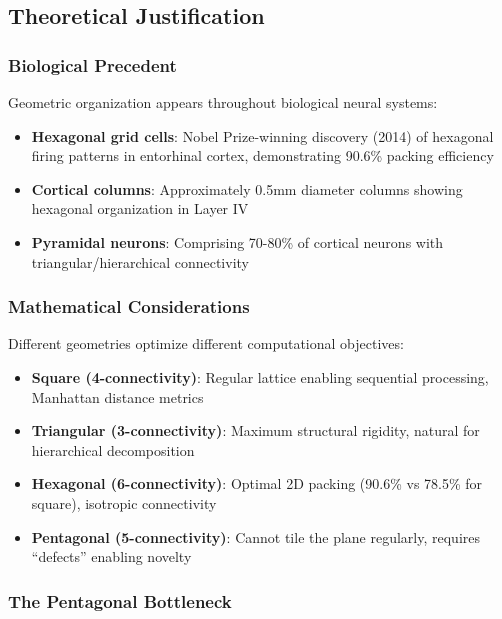 \documentclass[pmlr,onecolumn]{jmlr}
\begin{document}
\subsection{Theoretical Justification}

\subsubsection{Biological Precedent}

Geometric organization appears throughout biological neural systems:

\begin{itemize}
\item \textbf{Hexagonal grid cells}: Nobel Prize-winning discovery (2014) of hexagonal firing patterns in entorhinal cortex, demonstrating 90.6\% packing efficiency
\item \textbf{Cortical columns}: Approximately 0.5mm diameter columns showing hexagonal organization in Layer IV
\item \textbf{Pyramidal neurons}: Comprising 70-80\% of cortical neurons with triangular/hierarchical connectivity
\end{itemize}

\subsubsection{Mathematical Considerations}

Different geometries optimize different computational objectives:

\begin{itemize}
\item \textbf{Square (4-connectivity)}: Regular lattice enabling sequential processing, Manhattan distance metrics
\item \textbf{Triangular (3-connectivity)}: Maximum structural rigidity, natural for hierarchical decomposition
\item \textbf{Hexagonal (6-connectivity)}: Optimal 2D packing (90.6\% vs 78.5\% for square), isotropic connectivity
\item \textbf{Pentagonal (5-connectivity)}: Cannot tile the plane regularly, requires ``defects'' enabling novelty
\end{itemize}

\subsubsection{The Pentagonal Bottleneck}
\end{document}
